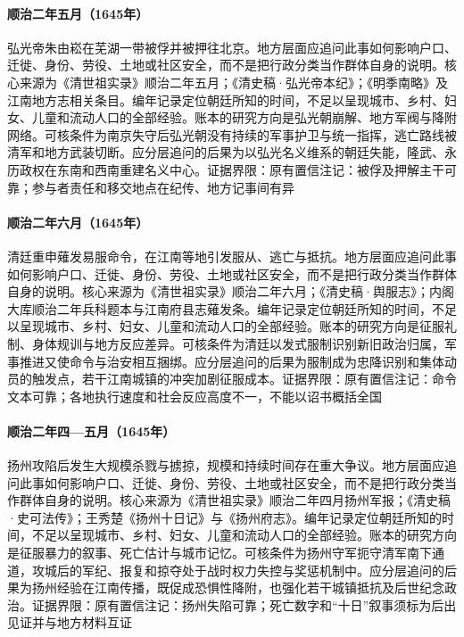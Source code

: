 \hypertarget{social:EQ-1645-HONGGUANG-CAPTURE}{}\paragraph{顺治二年五月（1645年）}弘光帝朱由崧在芜湖一带被俘并被押往北京。地方层面应追问此事如何影响户口、迁徙、身份、劳役、土地或社区安全，而不是把行政分类当作群体自身的说明。核心来源为《清世祖实录》顺治二年五月；《清史稿·弘光帝本纪》；《明季南略》及江南地方志相关条目。编年记录定位朝廷所知的时间，不足以呈现城市、乡村、妇女、儿童和流动人口的全部经验。账本的研究方向是弘光朝崩解、地方军阀与降附网络。可核条件为南京失守后弘光朝没有持续的军事护卫与统一指挥，逃亡路线被清军和地方武装切断。应分层追问的后果为以弘光名义维系的朝廷失能，隆武、永历政权在东南和西南重建名义中心。证据界限：原有置信注记：被俘及押解主干可靠；参与者责任和移交地点在纪传、地方记事间有异
\hypertarget{social:EQ-1645-HAIR-ORDER}{}\paragraph{顺治二年六月（1645年）}清廷重申薙发易服命令，在江南等地引发服从、逃亡与抵抗。地方层面应追问此事如何影响户口、迁徙、身份、劳役、土地或社区安全，而不是把行政分类当作群体自身的说明。核心来源为《清世祖实录》顺治二年六月；《清史稿·舆服志》；内阁大库顺治二年兵科题本与江南府县志薙发条。编年记录定位朝廷所知的时间，不足以呈现城市、乡村、妇女、儿童和流动人口的全部经验。账本的研究方向是征服礼制、身体规训与地方反应差异。可核条件为清廷以发式服制识别新旧政治归属，军事推进又使命令与治安相互捆绑。应分层追问的后果为服制成为忠降识别和集体动员的触发点，若干江南城镇的冲突加剧征服成本。证据界限：原有置信注记：命令文本可靠；各地执行速度和社会反应高度不一，不能以诏书概括全国
\hypertarget{social:EQ-1645-YANGZHOU}{}\paragraph{顺治二年四—五月（1645年）}扬州攻陷后发生大规模杀戮与掳掠，规模和持续时间存在重大争议。地方层面应追问此事如何影响户口、迁徙、身份、劳役、土地或社区安全，而不是把行政分类当作群体自身的说明。核心来源为《清世祖实录》顺治二年四月扬州军报；《清史稿·史可法传》；王秀楚《扬州十日记》与《扬州府志》。编年记录定位朝廷所知的时间，不足以呈现城市、乡村、妇女、儿童和流动人口的全部经验。账本的研究方向是征服暴力的叙事、死亡估计与城市记忆。可核条件为扬州守军扼守清军南下通道，攻城后的军纪、报复和掠夺处于战时权力失控与奖惩机制中。应分层追问的后果为扬州经验在江南传播，既促成恐惧性降附，也强化若干城镇抵抗及后世纪念政治。证据界限：原有置信注记：扬州失陷可靠；死亡数字和“十日”叙事须标为后出见证并与地方材料互证
